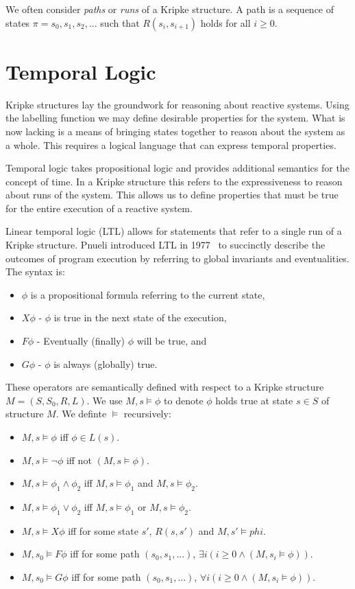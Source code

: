 We often consider \emph{paths} or \emph{runs} of a Kripke structure. A path is
a sequence of states $\pi = s_0, s_1, s_2, ...$ such that $R(s_i, s_{i+1})$
holds for all $i \geq 0$.

\section{Temporal Logic}

Kripke structures lay the groundwork for reasoning about reactive systems.
Using the labelling function we may define desirable properties for the system.
What is now lacking is a means of bringing states together to reason about the
system as a whole. This requires a logical language that can express temporal
properties.

Temporal logic takes propositional logic and provides additional semantics for
the concept of time. In a Kripke structure this refers to the expressiveness to
reason about runs of the system. This allows us to define properties that must
be true for the entire execution of a reactive system.

Linear temporal logic (LTL) allows for statements that refer to a single run of
a Kripke structure. Pnueli introduced LTL in 1977~\cite{Pnueli77} to succinctly
describe the outcomes of program execution by referring to global invariants
and eventualities. The syntax is:

\begin{itemize}
    \item $\phi$ is a propositional formula referring to the current state,
    \item $X\phi$ - $\phi$ is true in the next state of the execution,
    \item $F\phi$ - Eventually (finally) $\phi$ will be true, and
    \item $G\phi$ - $\phi$ is always (globally) true.
\end{itemize}

These operators are semantically defined with respect to a Kripke structure $M
= (S, S_0, R, L)$. We use $M, s \models \phi$ to denote $\phi$ holds true at
state $s \in S$ of structure $M$. We definte $\models$ recursively:

\begin{itemize}
    \item $M, s \models \phi$ iff $\phi \in L(s)$.
    \item $M, s \models \lnot\phi$ iff not $(M, s \models \phi)$.
    \item $M, s \models \phi_1 \land \phi_2$ iff $M, s \models \phi_1$ and $M, s \models \phi_2$.
    \item $M, s \models \phi_1 \lor \phi_2$ iff $M, s \models \phi_1$ or $M, s \models \phi_2$.
    \item $M, s \models X\phi$ iff for some state $s'$, $R(s, s')$ and $M, s' \models phi$.
    \item $M, s_0 \models F\phi$ iff for some path $(s_0, s_1, ...)$, $\exists i (i \geq 0 \land (M, s_i \models \phi))$.
    \item $M, s_0 \models G\phi$ iff for some path $(s_0, s_1, ...)$, $\forall i (i \geq 0 \land (M, s_i \models \phi))$.
\end{itemize}

